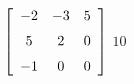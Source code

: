 {$\left[ \begin {array}{ccc} -2&-3&5\\\noalign{\medskip}5&2&0
\\\noalign{\medskip}-1&0&0\end {array} \right]$} 
{$10$}



  

